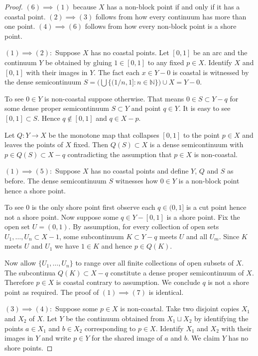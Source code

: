 \documentclass[12pt]{article}
\theoremstyle{plain}
\theoremstyle{definition}
\newcounter{claim5counter}
\newcommand{\NN}{\ensuremath{\mathbb N}}
\newcommand{\0}{\ensuremath{\varnothing}}
\begin{document}
\begin{proof}
$(6)\implies(1)$ because $X$ has a non-block point if and only if it has a coastal point.
$(2) \implies (3)$ follows from how every continuum has more than one point.
$(4) \implies (6)$ follows from how every non-block point is a shore point.

$(1) \implies (2):$ Suppose $X$ has no coastal points. 
Let $[0,1]$ be an arc and the continuum  $Y$ be obtained by gluing $1 \in [0,1]$ to any fixed $p\in X$.
Identify $X$ and $[0,1]$ with their images in $Y$.
The fact each $x \in Y -0$ is coastal is witnessed by
the dense semicontinuum $S = \big (\bigcup \{(1/n, 1] : n \in \NN \}\big ) \cup X = Y - 0$.

To see $0 \in Y$ is non-coastal suppose otherwise.
That means $ 0 \in S \subset Y-q$ for some dense proper semicontinuum $S \subset Y$ and point $q \in Y$.
It is easy to see $[0,1] \subset S$. Hence $q \notin [0,1]$ and $q \in X-p$.

Let $Q:Y \to X$ be the monotone map that collapses $[0,1]$ to the point $p \in X$ and leaves the points of $X$ fixed.
Then $Q(S) \subset X$ is a dense semicontinuum with $p \in Q(S) \subset X-q$ contradicting the assumption that $p \in X$
is non-coastal.

$(1) \implies (5):$ Suppose $X$ has no coastal points and define $Y$, $Q$ and $S$ as before.
The dense semicontinuum $S$ witnesses how $0 \in Y$ is a non-block point hence a shore point.

To see $0$ is the only shore point first observe each $q \in (0,1]$ is a cut point hence not a shore point.
Now suppose some $q \in Y - [0,1]$ is a shore point.
Fix the open set $U = (0,1)$.
By assumption, for every collection of open sets $U_1, \ldots , U_n \subset X-1$, some subcontinuum $K \subset  Y-q$ meets $U$ and all $U_m$.
Since $K$ meets $U$ and $U_1$ we have $1 \in K$ and hence $p \in Q(K)$.

Now allow $\{U_1,\ldots , U_n\}$ to range over all finite collections of open subsets of $X$.
The subcontinua $Q(K) \subset X - q$ constitute a dense proper semicontinuum of $X$.
Therefore $p \in X$ is coastal contrary to assumption.
We conclude $q$ is not a shore point as required.
The proof of $(1) \implies (7)$ is identical. 


$(3) \implies (4):$ Suppose some $p \in X$ is non-coastal. 
Take two disjoint copies $X_1$ and $X_2$ of $X$.
Let $Y$ be the continuum obtained from $X_1 \sqcup X_2$ by identifying the points $a \in X_1$ and $b \in X_2$ corresponding to $p \in X$.
Identify $X_1$ and $X_2$ with their images in $Y$ and write $p \in Y$ for the shared image of $a$ and $b$.
We claim $Y$ has no shore points.


\end{proof}
\end{document}
